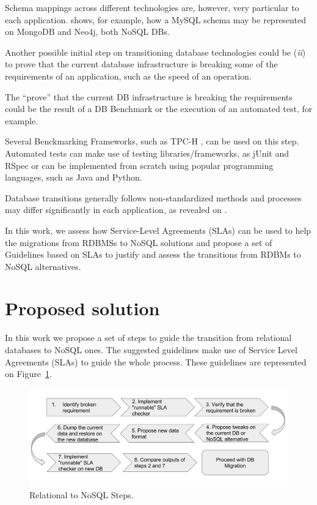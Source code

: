 Schema mappings across different technologies are, however, very particular to each application. \cite{bahl2014mysql} shows, for example, how a MySQL schema may be represented on MongoDB and Neo4j, both NoSQL DBs.

Another possible initial step on transitioning database technologies could be (\textit{ii}) to prove that the current database infrastructure is breaking some of the requirements of an application, such as the speed of an operation. 

The ``prove'' that the current DB infrastructure is breaking the requirements could be the result of a DB Benchmark or the execution of an automated test, for example. 

Several Benckmarking Frameworks, such as TPC-H \cite{council2008tpc}, can be used on this step. Automated tests can make use of testing libraries/frameworks, as jUnit \cite{massol2003junit} and RSpec \cite{chelimsky2010rspec} or can be implemented from scratch using popular programming languages, such as Java and Python.

Database transitions generally follows non-standardized methods and processes may differ significantly in each application, as revealed on \cite{fabioMartinSM}.

In this work, we assess how Service-Level Agreements (SLAs) can be used to help the migrations from RDBMSs to NoSQL solutions and propose a set of Guidelines based on SLAs to justify and assess the transitions from RDBMs to NoSQL alternatives.

\section{Proposed solution}

In this work we propose a set of steps to guide the transition from relational databases to NoSQL ones. The suggested guidelines make use of Service Level Agreements (SLAs) to guide the whole process. These guidelines are represented on Figure~\ref{fig:guidelinesNoSQL}.


\begin{figure}[ht!]
\centering
\includegraphics[width=150mm]{guidelines.png}
\caption{Relational to NoSQL Steps.\label{fig:guidelinesNoSQL}}
\end{figure}

